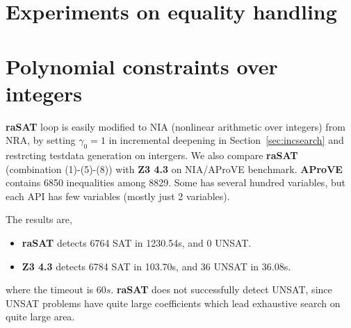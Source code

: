\section{Experiments on equality handling}


\section{Polynomial constraints over integers} \label{sec:NIA}

{\bf raSAT} loop is easily modified to NIA (nonlinear arithmetic over integers) from NRA, 
by setting $\gamma_0 = 1$ in incremental deepening in Section~\ref{sec:incsearch} 
and restrcting testdata generation on intergers. 
We also compare {\bf raSAT} (combination (1)-(5)-(8)) with {\bf Z3 4.3} on NIA/AProVE benchmark. 
{\bf AProVE} contains 6850 inequalities among 8829. 
Some has several hundred variables, but each API has few variables (mostly just 2 variables). 

The results are, 
\begin{itemize}
\item {\bf raSAT} detects 6764 SAT in 1230.54s, and 0 UNSAT. 
\item {\bf Z3 4.3} detects 6784 SAT in 103.70s, and 36 UNSAT in 36.08s. 
\end{itemize}
where the timeout is $60s$. 
{\bf raSAT} does not successfully detect UNSAT, since UNSAT problems have quite large coefficients
which lead exhaustive search on quite large area. 
